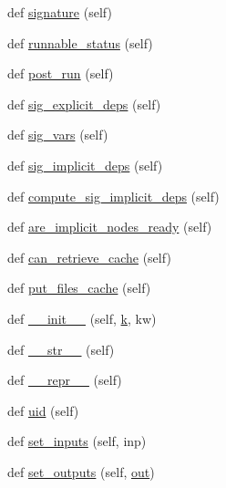 \begin{DoxyCompactItemize}
\item 
def \hyperlink{classwaflib_1_1_task_1_1_task_a48e55f13de8172b779a4e63794c7f44f}{signature} (self)
\item 
def \hyperlink{classwaflib_1_1_task_1_1_task_a2a281aaea77a0732f72103cfe4bc56c4}{runnable\+\_\+status} (self)
\item 
def \hyperlink{classwaflib_1_1_task_1_1_task_ac7c2e0bf22acd7d96399b1ca7f342232}{post\+\_\+run} (self)
\item 
def \hyperlink{classwaflib_1_1_task_1_1_task_a76a53025fb59fd6096f988ff64481070}{sig\+\_\+explicit\+\_\+deps} (self)
\item 
def \hyperlink{classwaflib_1_1_task_1_1_task_acffd01af005b390787b85239ac207282}{sig\+\_\+vars} (self)
\item 
def \hyperlink{classwaflib_1_1_task_1_1_task_a60ce159ef323481b09fcea4decb9e231}{sig\+\_\+implicit\+\_\+deps} (self)
\item 
def \hyperlink{classwaflib_1_1_task_1_1_task_adf3f63ea77fbca592ebc4244ba57887d}{compute\+\_\+sig\+\_\+implicit\+\_\+deps} (self)
\item 
def \hyperlink{classwaflib_1_1_task_1_1_task_a89612661d2073f53f62d7306a6c2238d}{are\+\_\+implicit\+\_\+nodes\+\_\+ready} (self)
\item 
def \hyperlink{classwaflib_1_1_task_1_1_task_a2085cfed25d49bed519af381621b29e7}{can\+\_\+retrieve\+\_\+cache} (self)
\item 
def \hyperlink{classwaflib_1_1_task_1_1_task_adf5e108580503738b2ab58eb1b56c10f}{put\+\_\+files\+\_\+cache} (self)
\item 
def \hyperlink{classwaflib_1_1_task_1_1_task_a566ab609bec4499aeab7bcd6f77f156e}{\+\_\+\+\_\+init\+\_\+\+\_\+} (self, \hyperlink{rfft2d_test_m_l_8m_adc468c70fb574ebd07287b38d0d0676d}{k}, kw)
\item 
def \hyperlink{classwaflib_1_1_task_1_1_task_a2507ae71718d699910a9dd8708664630}{\+\_\+\+\_\+str\+\_\+\+\_\+} (self)
\item 
def \hyperlink{classwaflib_1_1_task_1_1_task_ac05a045661750df307593224089759da}{\+\_\+\+\_\+repr\+\_\+\+\_\+} (self)
\item 
def \hyperlink{classwaflib_1_1_task_1_1_task_a910c51ea67c1c47ac40690bbba73b76a}{uid} (self)
\item 
def \hyperlink{classwaflib_1_1_task_1_1_task_a647c971bbca84d07daeff8d24f70ea18}{set\+\_\+inputs} (self, inp)
\item 
def \hyperlink{classwaflib_1_1_task_1_1_task_a8e650ed64c8370720574ebd8481a4f48}{set\+\_\+outputs} (self, \hyperlink{latency_8c_a71fd1c281affec034757279e4f91c50b}{out})

\end{DoxyCompactItemize}
